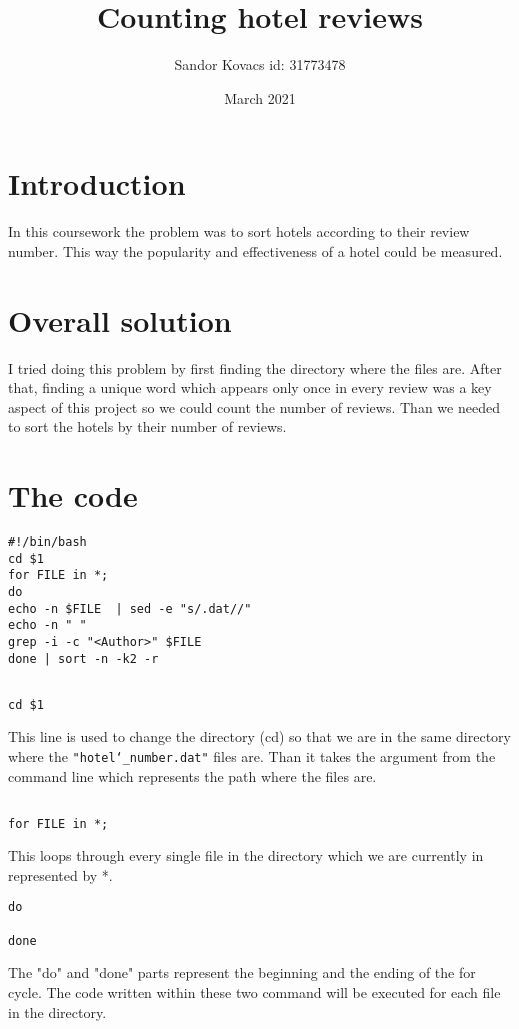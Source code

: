 \documentclass{article}
\title{Counting hotel reviews}
\author{Sandor Kovacs id: 31773478}
\date{March 2021}
\begin{document}
\maketitle


\section{Introduction}

In this coursework the problem was to sort hotels according to their review number. This way the popularity and effectiveness of a hotel could be measured.

\section{Overall solution}
I tried doing this problem by first finding the directory where the files are. After that, finding a unique word which appears only once in every review was a key aspect of this project so we could count the number of reviews. Than we needed to sort the hotels by their number of reviews.

\section{The code}

\begin{lstlisting}
#!/bin/bash
cd $1
for FILE in *;
do
echo -n $FILE  | sed -e "s/.dat//"
echo -n " "
grep -i -c "<Author>" $FILE
done | sort -n -k2 -r
\end{lstlisting}


\subsection{}
\begin{lstlisting}
cd $1
\end{lstlisting}
This line is used to change the directory (cd) so that we are in the same directory where the \texttt{"hotel\char`_number.dat"} files are. Than it takes the argument from the command line which represents the path where the files are.


\subsection{}
\begin{lstlisting}
for FILE in *;
\end{lstlisting}
This loops through every single file in the directory which we are currently in represented by *.
\begin{lstlisting}
do

done
\end{lstlisting}
The "do" and "done" parts represent the beginning and the ending of the for cycle. The code written within these two command will be executed for each file in the directory.
\end{document}
